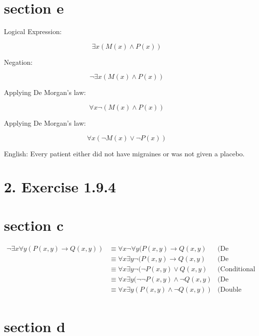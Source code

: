 \documentclass[10pt]{article}
\begin{document}
\section*{section e}
Logical Expression:

$$
\exists x(M(x) \wedge P(x))
$$

Negation:

$$
\neg \exists x(M(x) \wedge P(x))
$$

Applying De Morgan's law:

$$
\forall x \neg(M(x) \wedge P(x))
$$

Applying De Morgan's law:

$$
\forall x(\neg M(x) \vee \neg P(x))
$$

English: Every patient either did not have migraines or was not given a placebo.

\section*{2. Exercise 1.9.4}
\section*{section c}

$$
\begin{aligned}
\neg \exists x \forall y(P(x, y) \rightarrow Q(x, y)) & \equiv \forall x \neg \forall y(P(x, y) \rightarrow Q(x, y)& \text {(De Morgan's law)}\\
& \equiv \forall x \exists y \neg(P(x, y) \rightarrow Q(x, y)                                                      & \text {(De Morgan's law)}\\
& \equiv \forall x \exists y \neg(\neg P(x, y) \vee Q(x, y)                                                        & \text {(Conditional identity)}\\
& \equiv \forall x \exists y(\neg \neg P(x, y) \wedge \neg Q(x, y)                                                 & \text {(De Morgan's law)}\\
& \equiv \forall x \exists y(P(x, y) \wedge \neg Q(x, y))                                                          & \text {(Double negation law)}\\
\end{aligned}
$$

\section*{section d}
\end{document}
